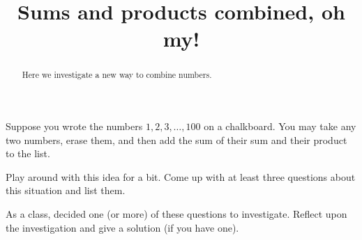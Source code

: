 \documentclass[handout,nooutcomes,space]{ximera}
\title{Sums and products combined, oh my!}
\begin{document}
\begin{abstract}
Here we investigate a new way to combine numbers.
\end{abstract}
\maketitle

Suppose you wrote the numbers $1,2,3,\dots,100$ on a chalkboard. You
may take any two numbers, erase them, and then add the sum of their
sum and their product to the list.

\begin{problem}
Play around with this idea for a bit. Come up with at least three
questions about this situation and list them.
\begin{freeResponse}
\end{freeResponse}
\end{problem}

\begin{problem}
As a class, decided one (or more) of these questions to
investigate. Reflect upon the investigation and give a solution (if
you have one).
\begin{freeResponse}
\end{freeResponse}
\end{problem}
\end{document}
